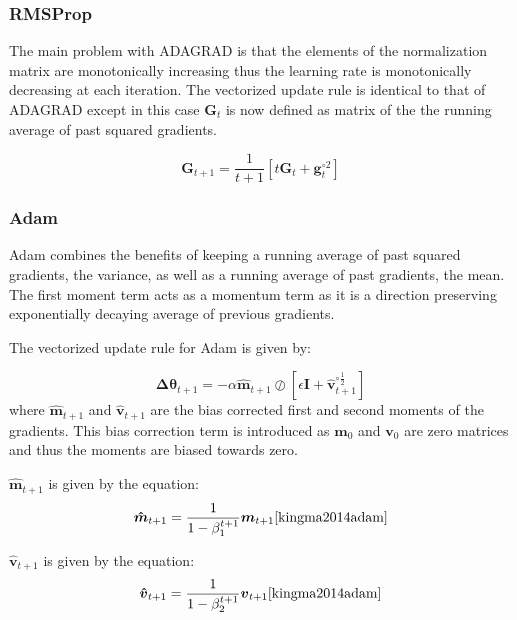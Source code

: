 \documentclass{article}
\begin{document}
\subsubsection{RMSProp}
The main problem with ADAGRAD is that the elements of the normalization matrix are monotonically increasing thus the learning rate is monotonically decreasing at each iteration.
The vectorized update rule is identical to that of ADAGRAD except in this case $\boldsymbol{G}_t$ is now defined as matrix of the the running average of past squared gradients.




\begin{equation}
\boldsymbol{G}_{t+1} = \frac{1}{t+1}[t\boldsymbol{G}_{t} + \boldsymbol{g}_{t}^{\circ{2}}]
\end{equation}
\subsubsection{Adam}
Adam combines the benefits of keeping a running average of past squared gradients, the variance, as well as a running average of past gradients, the mean. The first moment term acts as a momentum term as it is a direction preserving exponentially decaying average of previous gradients.

The vectorized update rule for Adam is given by:

\begin{equation}
\boldsymbol{\Delta{\theta}}_{t+1} = -\alpha\boldsymbol{\hat{m}}_{t+1}\oslash{[\epsilon\boldsymbol{I} +\boldsymbol{\hat{v}}_{t+1}^{\circ\frac{1}{2}}]}
\end{equation}
where $\boldsymbol{\hat{m}}_{t+1}$ and $\boldsymbol{\hat{v}}_{t+1}$ are the bias corrected first and second moments of the gradients. This bias correction term is introduced as $\boldsymbol{m}_0$ and $\boldsymbol{v}_0$ are zero matrices and thus the moments are biased towards zero.

$\boldsymbol{\hat{m}}_{t+1}$ is given by the equation:
\begin{equation}
\boldsymbol{\hat{m}}_{t+1} = \frac{1}{1-\beta_1^{t+1}}\boldsymbol{m}_{t+1}
\cite{kingma2014adam}
\end{equation}

$\boldsymbol{\hat{v}}_{t+1}$ is given by the equation:
\begin{equation}
\boldsymbol{\hat{v}}_{t+1} = \frac{1}{1-\beta_2^{t+1}}\boldsymbol{v}_{t+1}
\cite{kingma2014adam}
\end{equation}
\end{document}
